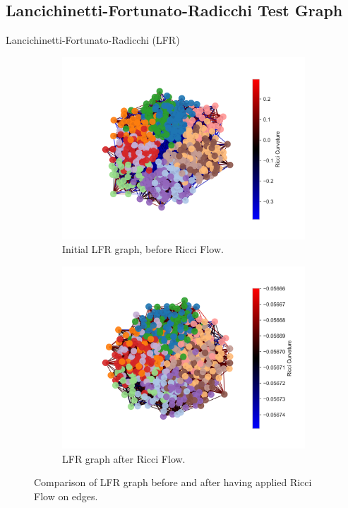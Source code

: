 \subsection{Lancichinetti-Fortunato-Radicchi Test Graph}
Lancichinetti-Fortunato-Radicchi (LFR)

\begin{figure}
    \centering
    \begin{subfigure}{0.45\textwidth}
        \centering
        \includegraphics[width=\textwidth]{../tests/ToyModelResults/LFR/Before Ricci Flow.png}
        \caption{Initial LFR graph, before Ricci Flow.}
    \end{subfigure}
    \hfill
    \begin{subfigure}{0.45\textwidth}
        \centering
        \includegraphics[width=\textwidth]{../tests/ToyModelResults/LFR/After Ricci Flow.png}
        \caption{LFR graph after Ricci Flow.}
    \end{subfigure}
    \caption{Comparison of LFR graph before and after having applied Ricci Flow on edges.}
\end{figure}
\label{fig:LFR_comparison}


